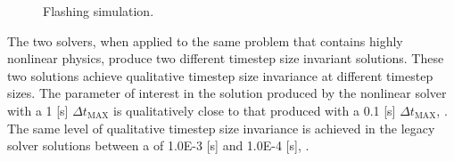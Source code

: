 \begin{figure}[h!t]
\centering
{}
\caption{Flashing simulation.}
\label{fig:flashing_solutions_1}
\end{figure}

The two solvers, when applied to the same problem that contains highly nonlinear physics, produce two different timestep size invariant solutions.
These two solutions achieve qualitative timestep size invariance at different timestep sizes.
The parameter of interest in the solution produced by the nonlinear solver with a 1 [s] $\Delta t_{\text{MAX}}$ is qualitatively close to that produced with a 0.1 [s] $\Delta t_{\text{MAX}}$, .
The same level of qualitative timestep size invariance is achieved in the legacy solver solutions between a \dtmax{} of 1.0E-3 [s] and 1.0E-4 [s], .

